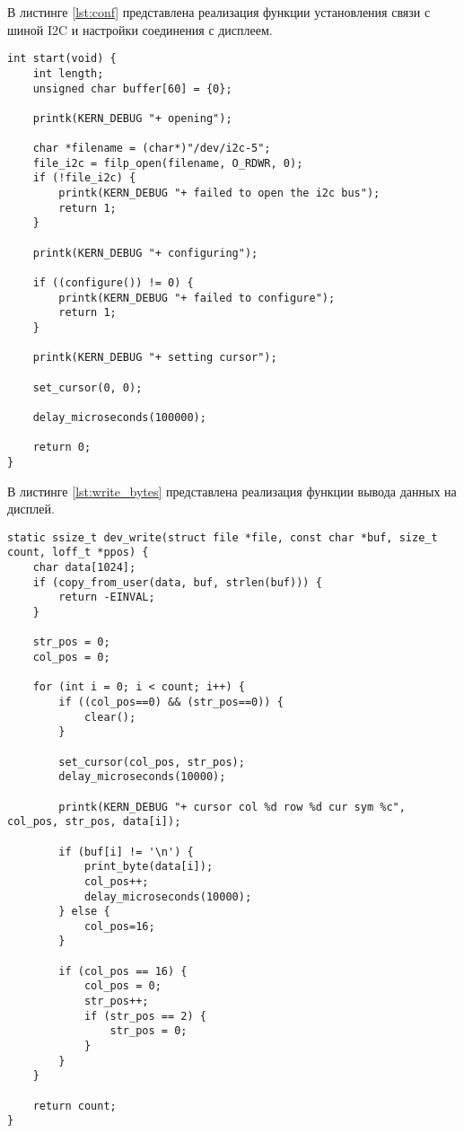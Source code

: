В листинге \ref{lst:conf} представлена реализация функции установления связи с шиной I2C и настройки соединения с дисплеем.

\begin{lstlisting}[label=lst:conf,caption=Реализация функции установления связи с шиной I2C и настройки соединения с дисплеем]
int start(void) {
    int length;
    unsigned char buffer[60] = {0};

    printk(KERN_DEBUG "+ opening");

    char *filename = (char*)"/dev/i2c-5";
    file_i2c = filp_open(filename, O_RDWR, 0);
    if (!file_i2c) {
        printk(KERN_DEBUG "+ failed to open the i2c bus");
        return 1;
    }

    printk(KERN_DEBUG "+ configuring");

    if ((configure()) != 0) {
        printk(KERN_DEBUG "+ failed to configure");
        return 1;
    }

    printk(KERN_DEBUG "+ setting cursor");

    set_cursor(0, 0);

    delay_microseconds(100000);

    return 0;
}
\end{lstlisting}

В листинге \ref{lst:write_bytes} представлена реализация функции вывода данных на дисплей.

\begin{lstlisting}[label=lst:write_bytes,caption=Реализация функции вывода данных на дисплей]
static ssize_t dev_write(struct file *file, const char *buf, size_t count, loff_t *ppos) {
    char data[1024];
    if (copy_from_user(data, buf, strlen(buf))) {
        return -EINVAL;
    }

    str_pos = 0;
    col_pos = 0;

    for (int i = 0; i < count; i++) {
        if ((col_pos==0) && (str_pos==0)) {
            clear();
        }

        set_cursor(col_pos, str_pos);
        delay_microseconds(10000);

        printk(KERN_DEBUG "+ cursor col %d row %d cur sym %c", col_pos, str_pos, data[i]);

        if (buf[i] != '\n') {
            print_byte(data[i]);
            col_pos++;
            delay_microseconds(10000);
        } else {
            col_pos=16;
        }

        if (col_pos == 16) {
            col_pos = 0;
            str_pos++;
            if (str_pos == 2) {
                str_pos = 0;
            }
        }
    }

    return count;
}
\end{lstlisting}

